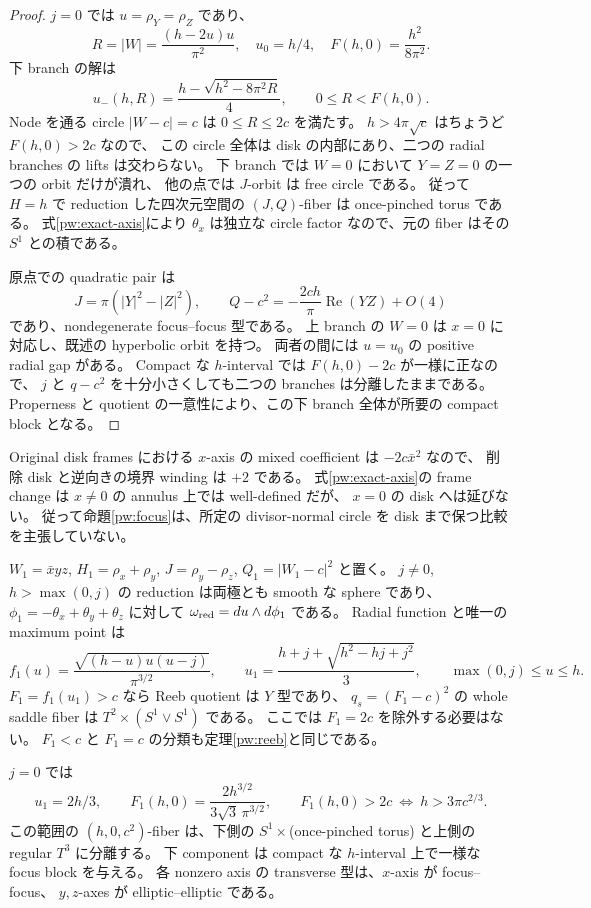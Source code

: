 \begin{proof}
$j=0$ では $u=\rho_Y=\rho_Z$ であり、
\[
 R=|W|=\frac{(h-2u)u}{\pi^2},\quad
 u_0=h/4,\quad F(h,0)=\frac{h^2}{8\pi^2}.
\]
下 branch の解は
\begin{equation}\label{pw:lower-root}
 u_-(h,R)=\frac{h-\sqrt{h^2-8\pi^2R}}4,
 \qquad 0\le R<F(h,0).
\end{equation}
Node を通る circle $|W-c|=c$ は $0\le R\le2c$ を満たす。
$h>4\pi\sqrt c$ はちょうど $F(h,0)>2c$ なので、
この circle 全体は disk の内部にあり、二つの radial branches の lifts は交わらない。
下 branch では $W=0$ において $Y=Z=0$ の一つの orbit だけが潰れ、
他の点では $J$-orbit は free circle である。
従って $H=h$ で reduction した四次元空間の $(J,Q)$-fiber は once-pinched torus である。
式\eqref{pw:exact-axis}により $\theta_x$ は独立な circle factor なので、元の fiber はその $S^1$ との積である。

原点での quadratic pair は
\[
 J=\pi(|Y|^2-|Z|^2),\qquad
 Q-c^2=-\frac{2ch}{\pi}\operatorname{Re}(YZ)+O(4)
\]
であり、nondegenerate focus--focus 型である。
上 branch の $W=0$ は $x=0$ に対応し、既述の hyperbolic orbit を持つ。
両者の間には $u=u_0$ の positive radial gap がある。
Compact な $h$-interval では $F(h,0)-2c$ が一様に正なので、
$j$ と $q-c^2$ を十分小さくしても二つの branches は分離したままである。
Properness と quotient の一意性により、この下 branch 全体が所要の compact block となる。
\end{proof}

Original disk frames における $x$-axis の mixed coefficient は $-2c\bar x^2$ なので、
削除 disk と逆向きの境界 winding は $+2$ である。
式\eqref{pw:exact-axis}の frame change は $x\ne0$ の annulus 上では well-defined だが、
$x=0$ の disk へは延びない。
従って命題\ref{pw:focus}は、所定の divisor-normal circle を disk まで保つ比較を主張していない。

\begin{corollary}
\label{pw:m1}
$W_1=\bar x yz$, $H_1=\rho_x+\rho_y$, $J=\rho_y-\rho_z$,
$Q_1=|W_1-c|^2$ と置く。
$j\ne0$, $h>\max(0,j)$ の reduction は両極とも smooth な sphere であり、
$\phi_1=-\theta_x+\theta_y+\theta_z$ に対して $\omega_{\rm red}=du\wedge d\phi_1$ である。
Radial function と唯一の maximum point は
\[
 f_1(u)=\frac{\sqrt{(h-u)u(u-j)}}{\pi^{3/2}},\qquad
 u_1=\frac{h+j+\sqrt{h^2-hj+j^2}}3,
 \qquad \max(0,j)\le u\le h.
\]
$F_1=f_1(u_1)>c$ なら Reeb quotient は $Y$ 型であり、
$q_s=(F_1-c)^2$ の whole saddle fiber は $T^2\times(S^1\vee S^1)$ である。
ここでは $F_1=2c$ を除外する必要はない。
$F_1<c$ と $F_1=c$ の分類も定理\ref{pw:reeb}と同じである。

$j=0$ では
\[
 u_1=2h/3,\qquad F_1(h,0)=\frac{2h^{3/2}}{3\sqrt3\,\pi^{3/2}},
 \qquad F_1(h,0)>2c\ \Longleftrightarrow\ h>3\pi c^{2/3}.
\]
この範囲の $(h,0,c^2)$-fiber は、下側の
$S^1\times$(once-pinched torus) と上側の regular $T^3$ に分離する。
下 component は compact な $h$-interval 上で一様な focus block を与える。
各 nonzero axis の transverse 型は、$x$-axis が focus--focus、
$y,z$-axes が elliptic--elliptic である。
\end{corollary}

